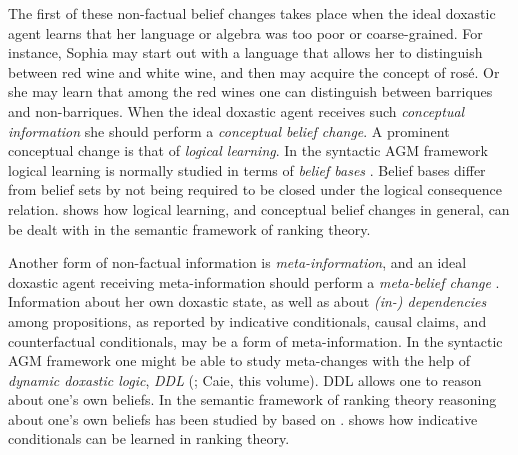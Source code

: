 The first of these non-factual belief changes takes place when the ideal doxastic agent learns that her language or algebra was too poor or coarse-grained. For instance, Sophia may start out with a language that allows her to distinguish between red wine and white wine, and then may acquire the concept of ros\'{e}. Or she may learn that among the red wines one can distinguish between barriques and non-barriques. When the ideal doxastic agent receives such \emph{conceptual information} she should perform a \emph{conceptual belief change}. A prominent conceptual change is that of \emph{logical learning}. In the syntactic AGM framework logical learning is normally studied in terms of \emph{belief bases} \citep{h99}. Belief bases differ from belief sets by not being required to be closed under the logical consequence relation. \citet{h15a} shows how logical learning, and conceptual belief changes in general, can be dealt with in the semantic framework of ranking theory.

Another form of non-factual information is \emph{meta-information}, and an ideal doxastic agent receiving meta-information should perform a \emph{meta-belief change} \citep{s09}. Information about her own doxastic state, as well as about \emph{(in-) dependencies} among propositions, as reported by indicative conditionals, causal claims, and counterfactual conditionals, may be a form of meta-information. In the syntactic AGM framework one might be able to study meta-changes with the help of \emph{dynamic doxastic logic}, \emph{DDL} (\citealt{s95, lr99}; Caie, this volume). DDL allows one to reason about one's own beliefs. In the semantic framework of ranking theory reasoning about one's own beliefs has been studied by \citet[chaper 9]{s12} %
 based on \citet{h98}. \citet{h15a} shows how indicative conditionals %
can be learned in ranking theory.


